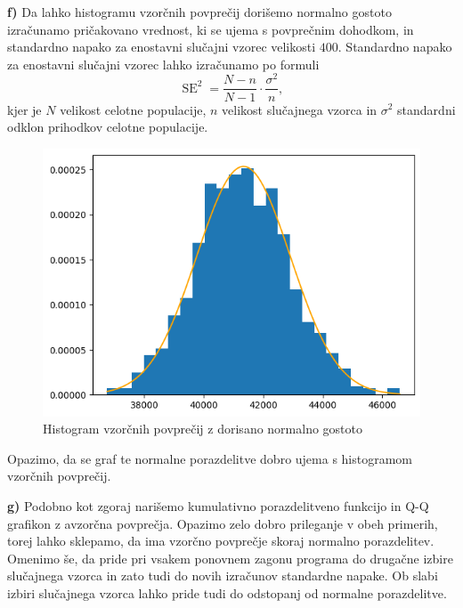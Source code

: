 \documentclass[a4paper,11pt]{article}
\begin{document}
\noindent
\textbf{f)} Da lahko histogramu vzorčnih povprečij dorišemo normalno gostoto izračunamo pričakovano vrednost, ki se ujema s povprečnim dohodkom, in standardno napako za enostavni slučajni vzorec velikosti $400$. Standardno napako za enostavni slučajni vzorec lahko izračunamo po formuli 
\[
    \operatorname{SE}^2 = \frac{N-n}{N-1}\cdot\frac{\sigma^2}{n},
\]
kjer je $N$ velikost celotne populacije, $n$ velikost slučajnega vzorca in $\sigma^2$ standardni odklon prihodkov celotne populacije. 


\begin{figure}[H]
    \centering
    \includegraphics[scale = 0.5]{slike1/1_6.png}
    \caption{Histogram vzorčnih povprečij z dorisano normalno gostoto}
\end{figure}

\noindent Opazimo, da se graf te normalne porazdelitve dobro ujema s histogramom vzorčnih povprečij. 
\newline

\noindent
\textbf{g)} Podobno kot zgoraj narišemo kumulativno porazdelitveno funkcijo in Q-Q grafikon z avzorčna povprečja. Opazimo zelo dobro prileganje v obeh primerih, torej lahko sklepamo, da ima vzorčno povprečje skoraj normalno porazdelitev. Omenimo še, da pride pri vsakem ponovnem zagonu programa do drugačne izbire slučajnega vzorca in zato tudi do novih izračunov standardne napake. Ob slabi izbiri slučajnega vzorca lahko pride tudi do odstopanj od normalne porazdelitve.
\newline
\end{document}
